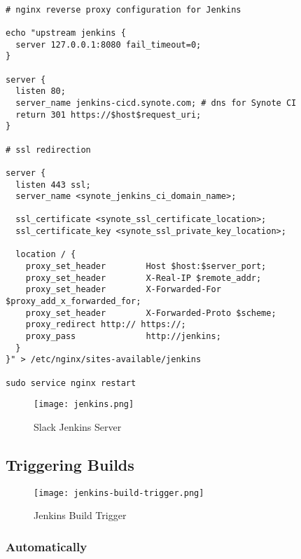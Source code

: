 \begin{listing}[H]
\begin{verbatim}

# nginx reverse proxy configuration for Jenkins

echo "upstream jenkins {
  server 127.0.0.1:8080 fail_timeout=0;
}

server {
  listen 80;
  server_name jenkins-cicd.synote.com; # dns for Synote CI
  return 301 https://$host$request_uri;
}

# ssl redirection

server {
  listen 443 ssl;
  server_name <synote_jenkins_ci_domain_name>;

  ssl_certificate <synote_ssl_certificate_location>;
  ssl_certificate_key <synote_ssl_private_key_location>;

  location / {
    proxy_set_header        Host $host:$server_port;
    proxy_set_header        X-Real-IP $remote_addr;
    proxy_set_header        X-Forwarded-For $proxy_add_x_forwarded_for;
    proxy_set_header        X-Forwarded-Proto $scheme;
    proxy_redirect http:// https://;
    proxy_pass              http://jenkins;
  }
}" > /etc/nginx/sites-available/jenkins

sudo service nginx restart

\end{verbatim}
\label{lst:make-jenkins-available}
\end{listing}

\begin{figure}[!hbt]
  	\centering
 	\texttt{[image: jenkins.png]}
  	\caption{Slack Jenkins Server}
 	\label{fig:synote-jenkins-server}
\end{figure}

\subsection{Triggering Builds}
\label{subsec:triggering-builds}

\begin{figure}[!hbt]
  	\centering
 	\texttt{[image: jenkins-build-trigger.png]}
  	\caption{Jenkins Build Trigger}
 	\label{fig:jenkin-build-trigger}
\end{figure}

\subsubsection{Automatically}
\label{subsubsec:triggering-builds-automatically}

